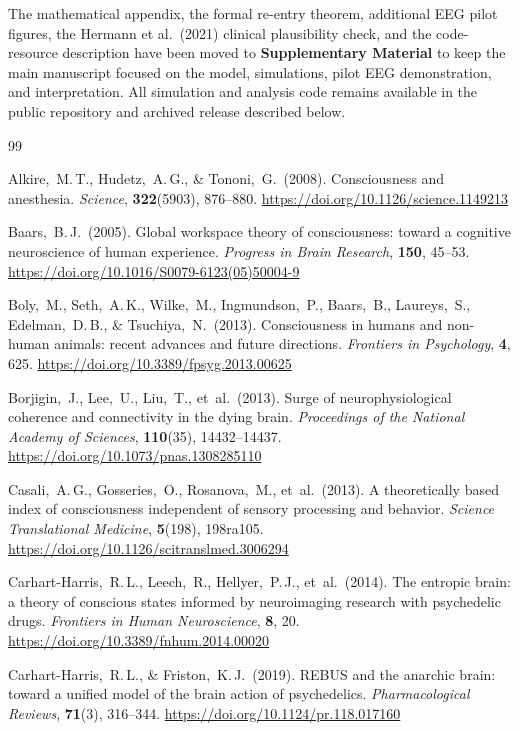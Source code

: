 ﻿\documentclass[11pt,a4paper]{article}
\theoremstyle{plain}
\theoremstyle{definition}
\theoremstyle{remark}
\begin{document}
The mathematical appendix, the formal re-entry theorem, additional EEG pilot figures, the Hermann et al.\ (2021) clinical plausibility check, and the code-resource description have been moved to \textbf{Supplementary Material} to keep the main manuscript focused on the model, simulations, pilot EEG demonstration, and interpretation. All simulation and analysis code remains available in the public repository and archived release described below.
\newpage
\begin{thebibliography}{99}

Alkire,~M.\,T., Hudetz,~A.\,G., \& Tononi,~G.\ (2008).
Consciousness and anesthesia.
\textit{Science}, \textbf{322}(5903), 876--880.
\url{https://doi.org/10.1126/science.1149213}

Baars,~B.\,J.\ (2005).
Global workspace theory of consciousness: toward a cognitive neuroscience of human experience.
\textit{Progress in Brain Research}, \textbf{150}, 45--53.
\url{https://doi.org/10.1016/S0079-6123(05)50004-9}

Boly,~M., Seth,~A.\,K., Wilke,~M., Ingmundson,~P., Baars,~B., Laureys,~S., Edelman,~D.\,B., \& Tsuchiya,~N.\ (2013).
Consciousness in humans and non-human animals: recent advances and future directions.
\textit{Frontiers in Psychology}, \textbf{4}, 625.
\url{https://doi.org/10.3389/fpsyg.2013.00625}

Borjigin,~J., Lee,~U., Liu,~T., et~al.\ (2013).
Surge of neurophysiological coherence and connectivity in the dying brain.
\textit{Proceedings of the National Academy of Sciences}, \textbf{110}(35), 14432--14437.
\url{https://doi.org/10.1073/pnas.1308285110}

Casali,~A.\,G., Gosseries,~O., Rosanova,~M., et~al.\ (2013).
A theoretically based index of consciousness independent of sensory processing and behavior.
\textit{Science Translational Medicine}, \textbf{5}(198), 198ra105.
\url{https://doi.org/10.1126/scitranslmed.3006294}

Carhart-Harris,~R.\,L., Leech,~R., Hellyer,~P.\,J., et~al.\ (2014).
The entropic brain: a theory of conscious states informed by neuroimaging research with psychedelic drugs.
\textit{Frontiers in Human Neuroscience}, \textbf{8}, 20.
\url{https://doi.org/10.3389/fnhum.2014.00020}

Carhart-Harris,~R.\,L., \& Friston,~K.\,J.\ (2019).
REBUS and the anarchic brain: toward a unified model of the brain action of psychedelics.
\textit{Pharmacological Reviews}, \textbf{71}(3), 316--344.
\url{https://doi.org/10.1124/pr.118.017160}


\end{thebibliography}
\end{document}
